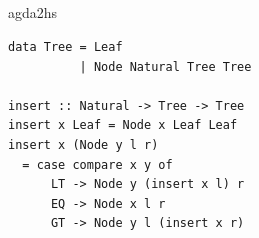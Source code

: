 \documentclass[aspectratio=43]{beamer}
\begin{document}
{\begin{code}
\\
\>[0][@{}l@{\AgdaIndent{0}}]%
\>[2]\AgdaSpace{}%
\AgdaSymbol{:}\AgdaSpace{}%
\AgdaSymbol{\{\{}\AgdaSpace{}%
\AgdaSymbol{\}\}}\AgdaSpace{}%
\AgdaSpace{}%
\AgdaSpace{}%
\AgdaSymbol{(}\AgdaSpace{}%
\AgdaSymbol{)}\<%
\\
%
\>[2]\AgdaSpace{}%
\AgdaSymbol{\{}\AgdaSpace{}%
\AgdaSymbol{=}\AgdaSpace{}%
\AgdaSymbol{\}}\AgdaSpace{}%
\AgdaSymbol{=}\AgdaSpace{}%
\AgdaSpace{}%
\AgdaSymbol{\{}\AgdaSpace{}%
\AgdaSymbol{\}}\<%
\\
\>[2][@{}l@{\AgdaIndent{0}}]%
\>[4]\<%
\\
%
\>[4]\AgdaSpace{}%
\AgdaSymbol{:}\AgdaSpace{}%
\AgdaSpace{}%
\AgdaSymbol{(}\AgdaSpace{}%
\AgdaSymbol{)}\<%
\\
%
\>[4]\AgdaSpace{}%
\AgdaSpace{}%
\AgdaSpace{}%
\AgdaSymbol{=}\AgdaSpace{}%
\AgdaSpace{}%
\<%
\\
\>[4][@{}l@{\AgdaIndent{0}}]%
\>[6]%
\>[16]\AgdaSpace{}%
\AgdaSpace{}%
\<%
\\
%
\>[6]\AgdaSymbol{(}\AgdaSpace{}%
\AgdaSymbol{)}%
\>[16]\AgdaSpace{}%
\AgdaSpace{}%
\<%
\\
\>[6][@{}l@{\AgdaIndent{0}}]%
\>[8]\AgdaSymbol{(}\AgdaSpace{}%
\AgdaSpace{}%
\AgdaSpace{}%
\AgdaSpace{}%
\AgdaSpace{}%
\AgdaSymbol{)}\<%
\\
\>[0]\AgdaSymbol{\{-\#}\AgdaSpace{}%
\AgdaSpace{}%
\AgdaSpace{}%
\AgdaSpace{}%
\AgdaSymbol{\#-\}}\<%
\end{code}}

\setlength{\AgdaEmptySkip}{1em}
\renewcommand{\AgdaCodeStyle}{\scriptsize}
\begin{frame}[fragile]{agda2hs}
\begin{minipage}[l]{.5\textwidth}
\agdaTrees{}
\end{minipage}
\hfill\vline\hfill
\begin{minipage}[r]{.4\textwidth}
\begin{verbatim}
data Tree = Leaf
          | Node Natural Tree Tree

insert :: Natural -> Tree -> Tree
insert x Leaf = Node x Leaf Leaf
insert x (Node y l r)
  = case compare x y of
      LT -> Node y (insert x l) r
      EQ -> Node x l r
      GT -> Node y l (insert x r)
\end{verbatim}
\end{minipage}
\end{frame}
\end{document}
